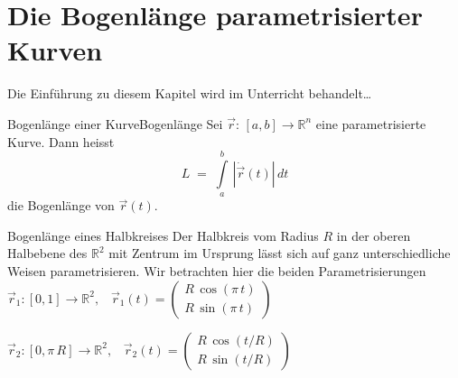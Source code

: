 \section{Die Bogenlänge parametrisierter Kurven}
Die Einführung zu diesem Kapitel wird im Unterricht behandelt\dots




\begin{definition}
    {Bogenlänge einer Kurve}{Bogenlänge}
    Sei \(\vec{r}: \, [a,b] \longrightarrow \mathbb{R}^n\) eine parametrisierte Kurve. Dann heisst
    \[L \; = \; \int\limits_{a}^{b} \, |\dot{\vec{r}}(t)| \, dt \]
    die Bogenlänge von \(\vec{r}(t)\).
\end{definition}

\begin{bsp}{Bogenlänge eines Halbkreises}{}
    Der Halbkreis vom Radius \(R\) in der oberen Halbebene des \(\mathbb{R}^2\) mit Zentrum im Ursprung lässt sich auf ganz unterschiedliche Weisen parametrisieren. Wir betrachten hier die beiden Parametrisierungen
    \(\vec{r}_1:[0,1] \longrightarrow \mathbb{R}^2, \;\;\; \vec{r}_1(t) = \begin{pmatrix}
        R \, \cos (\pi \, t) \\
        R \, \sin(\pi \, t)
    \end{pmatrix} \)

    \vspace*{12cm}
    \pagebreak
    \(\vec{r}_2:[0,\pi \, R] \longrightarrow \mathbb{R}^2, \;\;\; \vec{r}_2(t) = \begin{pmatrix}
        R \, \cos (t/R) \\
        R \, \sin(t/R)
    \end{pmatrix}\)

    \vspace*{10cm}
\end{bsp}

